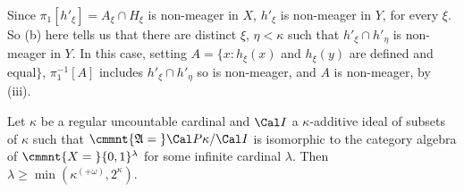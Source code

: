 {\medskip

Since $\pi_1[h'_{\xi}]=A_{\xi}\cap H_{\xi}$ is non-meager in $X$, $h'_{\xi}$ is
non-meager in $Y$, for every $\xi$.   So (b) here tells us that there are distinct
$\xi$, $\eta<\kappa$ such that $h'_{\xi}\cap h'_{\eta}$ is non-meager in $Y$.
In this case, setting $A=\{x:h_{\xi}(x)$ and $h_{\xi}(y)$ are defined and equal$\}$,
$\pi_1^{-1}[A]$ includes $h'_{\xi}\cap h'_{\eta}$ so is non-meager, and $A$ is
non-meager, by (iii).
}%

 Let $\kappa$ be a regular uncountable
cardinal and
$\Cal I$ a $\kappa$-additive ideal of subsets of $\kappa$ such that
$\cmmnt{\frak A=\mskip5mu}\Cal P\kappa/\Cal I$
is isomorphic to the category algebra of
$\cmmnt{X=\mskip5mu}\{0,1\}^{\lambda}$ for some infinite
cardinal $\lambda$.   Then $\lambda\ge\min(\kappa^{(+\omega)},2^{\kappa})$.

